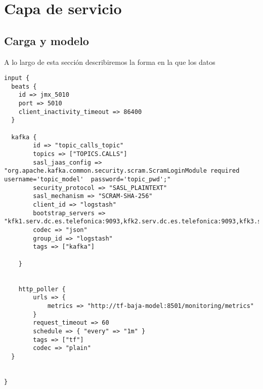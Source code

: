 \chapter{Capa de servicio}
\label{chapter:servicio}




\section{Carga y modelo}
A lo largo de esta sección describiremos la forma en la que los datos 





\begin{verbatim}
input {
  beats {
    id => jmx_5010
    port => 5010
    client_inactivity_timeout => 86400
  }

  kafka {
        id => "topic_calls_topic"
        topics => ["TOPICS.CALLS"]
        sasl_jaas_config => "org.apache.kafka.common.security.scram.ScramLoginModule required username='topic_model'  password='topic_pwd';"
        security_protocol => "SASL_PLAINTEXT"
        sasl_mechanism => "SCRAM-SHA-256"
        client_id => "logstash"
        bootstrap_servers => "kfk1.serv.dc.es.telefonica:9093,kfk2.serv.dc.es.telefonica:9093,kfk3.serv.dc.es.telefonica:9093"
        codec => "json"
        group_id => "logstash"
        tags => ["kafka"]
        
    }


    http_poller {
        urls => {
            metrics => "http://tf-baja-model:8501/monitoring/metrics"
        }
        request_timeout => 60
        schedule => { "every" => "1m" }
        tags => ["tf"]
        codec => "plain"
  }


} 	
 	
\end{verbatim}


